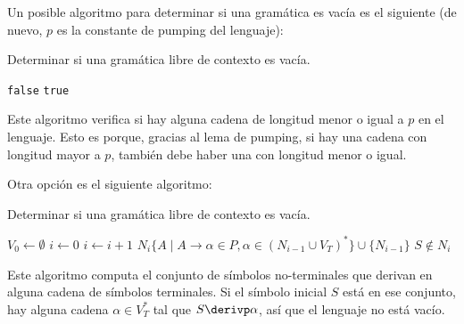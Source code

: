 Un posible algoritmo para determinar si una gramática es vacía es el siguiente (de nuevo, $p$ es la constante de pumping del lenguaje):
\begin{algorithm}[H]
    \caption{Determinar si una gramática libre de contexto es vacía.}
    \label{glc-vacia}
    \begin{algorithmic}[1]
        \State \Return \texttt{false}
        \Else
        \State \Return \texttt{true}
        \EndIf
        \EndProcedure
    \end{algorithmic}
\end{algorithm}

Este algoritmo verifica si hay alguna cadena de longitud menor o igual a $p$ en el lenguaje. Esto es porque, gracias al lema de pumping, si hay una cadena con longitud mayor a $p$, también debe haber una con longitud menor o igual.

Otra opción es el siguiente algoritmo:

\begin{algorithm}[H]
    \caption{Determinar si una gramática libre de contexto es vacía.}
    \label{glc-vacia2}
    \begin{algorithmic}[1]
        \State $V_0 \gets \emptyset$
        \State $i \gets 0$
        \Repeat
        \State $i \gets i + 1$
        \State $N_i \{A \mid A \to \alpha \in P, \alpha \in (N_{i - 1} \cup V_T)^*\} \cup \{N_{i - 1}\}$
        \State \Return $S \notin N_i$
        \EndProcedure
    \end{algorithmic}
\end{algorithm}

Este algoritmo computa el conjunto de símbolos no-terminales que derivan en alguna cadena de símbolos terminales. Si el símbolo inicial $S$ está en ese conjunto, hay alguna cadena $\alpha \in V_T^*$ tal que $S \derivp \alpha$, así que el lenguaje no está vacío.
